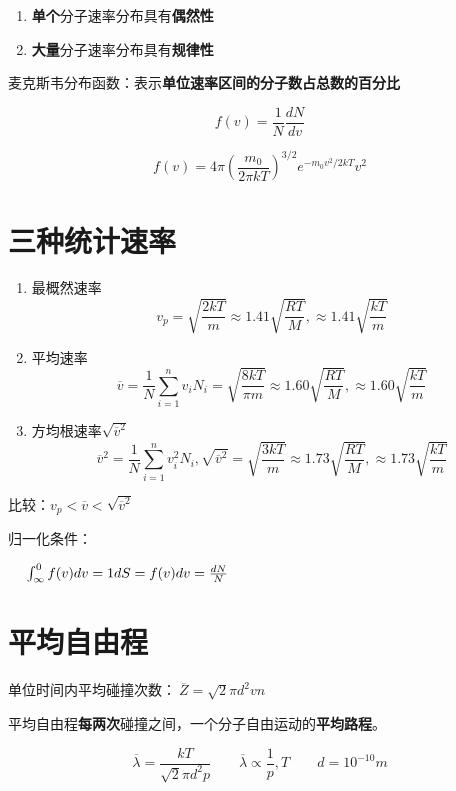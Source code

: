 \begin{enumerate}
    \item \textbf{单个}分子速率分布具有\textbf{偶然性}
    \item \textbf{大量}分子速率分布具有\textbf{规律性}
\end{enumerate}

麦克斯韦分布函数：表示\textbf{单位速率区间的分子数占总数的百分比}

\begin{equation}
    f(v)=\frac{1}{N}\frac{dN}{dv}
\end{equation}

\begin{equation}
    f(v)=4\pi \left(\frac{m_0}{2\pi kT}\right)^{3/2}e^{-m_0v^2/2kT}v^2
\end{equation}

\section{三种统计速率}

\begin{enumerate}

    \item 最概然速率
          \begin{equation}
              v_p=\sqrt{\frac{2kT}{m}}\approx 1.41\sqrt{\frac{RT}{M}},\approx 1.41\sqrt{\frac{kT}{m}}
          \end{equation}

    \item 平均速率
          \begin{equation}
              \overline {v}=\frac{1}{N}\sum_{i=1}^n{v_iN_i}=\sqrt{\frac{8kT}{\pi m}}\approx 1.60\sqrt{\frac{RT}{M}},\approx 1.60\sqrt{\frac{kT}{m}}
          \end{equation}

    \item 方均根速率$\sqrt{\overline{v}^2}$
          \begin{equation}
              \overline{v}^2=\frac{1}{N}\sum_{i=1}^n{v_i^2N_i},\sqrt{\overline{v}^2}=\sqrt{\frac{3kT}{m}}\approx 1.73\sqrt{\frac{RT}{M}},\approx 1.73\sqrt{\frac{kT}{m}}
          \end{equation}

\end{enumerate}

比较：$v_p<\overline{v}<\sqrt{\overline{v}^2}$

归一化条件：

$\hspace{3ex} \int^{0}_{\infty}{f(v)dv}=1\\dS=f(v)dv=\frac{dN}{N}$

\section{平均自由程}

单位时间内平均碰撞次数：$~\overline{Z}=\sqrt{2}\pi{}d^2vn$

平均自由程\textbf{每两次}碰撞之间，一个分子自由运动的\textbf{平均路程}。

\begin{equation}
    \overline{\lambda}=\frac{kT}{\sqrt{2}\pi{}d^2p}\qquad\overline{\lambda{}}\propto\frac{1}{p},T\qquad d=10^{-10}m
\end{equation}

\newpage
